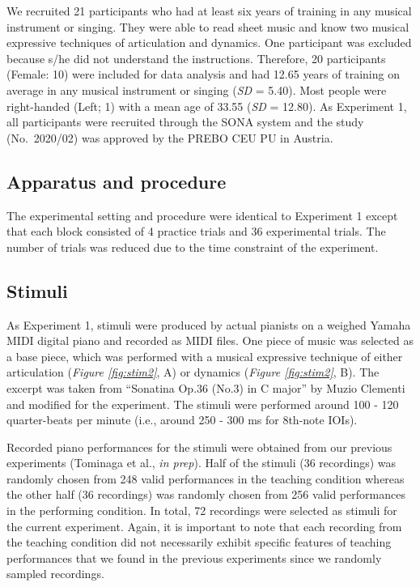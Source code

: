 \documentclass[
  man,floatsintext]{apa6}
\begin{document}
We recruited 21 participants who had at least six years of training in any musical instrument or singing. They were able to read sheet music and know two musical expressive techniques of articulation and dynamics. One participant was excluded because s/he did not understand the instructions. Therefore, 20 participants (Female: 10) were included for data analysis and had 12.65 years of training on average in any musical instrument or singing (\emph{SD} = 5.40). Most people were right-handed (Left; 1) with a mean age of 33.55 (\emph{SD} = 12.80). As Experiment 1, all participants were recruited through the SONA system and the study (No.~2020/02) was approved by the PREBO CEU PU in Austria.

\hypertarget{apparatus-and-procedure}{%
\subsection{Apparatus and procedure}\label{apparatus-and-procedure}}

The experimental setting and procedure were identical to Experiment 1 except that each block consisted of 4 practice trials and 36 experimental trials. The number of trials was reduced due to the time constraint of the experiment.

\hypertarget{stimuli-1}{%
\subsection{Stimuli}\label{stimuli-1}}

As Experiment 1, stimuli were produced by actual pianists on a weighed Yamaha MIDI digital piano and recorded as MIDI files. One piece of music was selected as a base piece, which was performed with a musical expressive technique of either articulation (\emph{Figure \ref{fig:stim2}}, A) or dynamics (\emph{Figure \ref{fig:stim2}}, B). The excerpt was taken from ``Sonatina Op.36 (No.3) in C major'' by Muzio Clementi and modified for the experiment. The stimuli were performed around 100 - 120 quarter-beats per minute (i.e., around 250 - 300 ms for 8th-note IOIs).

Recorded piano performances for the stimuli were obtained from our previous experiments (Tominaga et al., \emph{in prep}). Half of the stimuli (36 recordings) was randomly chosen from 248 valid performances in the teaching condition whereas the other half (36 recordings) was randomly chosen from 256 valid performances in the performing condition. In total, 72 recordings were selected as stimuli for the current experiment. Again, it is important to note that each recording from the teaching condition did not necessarily exhibit specific features of teaching performances that we found in the previous experiments since we randomly sampled recordings.
\end{document}
